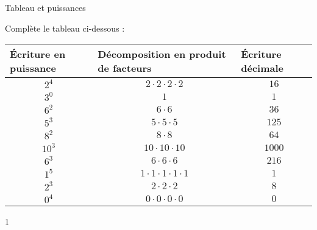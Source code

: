 \documentclass[a4paper,11pt]{report}
\begin{document}
\begin{resolu}{Tableau et puissances}{Complète le tableau ci-dessous : 
\begin{center}
{\renewcommand{\arraystretch}{1.8}
\begin{tabular}{|m{4.6cm}|m{4.6cm}|m{4.6cm}|}\hline
Écriture en puissance    & Décomposition en produit de facteurs  & Écriture décimale\\\hline
\multicolumn{1}{|c|}{ $2^4$}    & \multicolumn{1}{c|}{\color{blue}$2\cdot 2 \cdot 2 \cdot 2$} &  \multicolumn{1}{c|}{\color{blue}$16$} \\\hline
 \multicolumn{1}{|c|}{\color{blue} $3^0$} & \multicolumn{1}{c|}{$1$} & \multicolumn{1}{c|}{\color{blue}$1$} \\\hline
\multicolumn{1}{|c|}{\color{blue}$6^2$} & \multicolumn{1}{c|}{\color{blue}$6 \cdot 6$} & \multicolumn{1}{c|}{$36$}\\\hline
\multicolumn{1}{|c|}{$5^3$} & \multicolumn{1}{c|}{\color{blue} $ 5\cdot 5 \cdot 5$} & \multicolumn{1}{c|}{\color{blue}$125$} \\\hline
\multicolumn{1}{|c|}{\color{blue}$8^2$} & \multicolumn{1}{c|}{$8\cdot 8 $} & \multicolumn{1}{c|}{\color{blue}$64 $} \\\hline
\multicolumn{1}{|c|}{\color{blue}$10^3 $} & \multicolumn{1}{c|}{\color{blue} $10\cdot 10 \cdot 10 $} & \multicolumn{1}{c|}{$1000 $} \\\hline
\multicolumn{1}{|c|}{$6^3$} & \multicolumn{1}{c|}{\color{blue} $ 6\cdot 6 \cdot 6$} & \multicolumn{1}{c|}{\color{blue}$216$} \\\hline
\multicolumn{1}{|c|}{\color{blue}$1^5$} & \multicolumn{1}{c|}{$1\cdot 1\cdot 1\cdot 1\cdot 1 $} & \multicolumn{1}{c|}{\color{blue}$1 $} \\\hline
\multicolumn{1}{|c|}{\color{blue}$2^3 $} & \multicolumn{1}{c|}{\color{blue} $2\cdot 2 \cdot 2 $} & \multicolumn{1}{c|}{$8$} \\\hline
\multicolumn{1}{|c|}{$0^4$} & \multicolumn{1}{c|}{\color{blue} $ 0\cdot 0 \cdot 0 \cdot 0$} & \multicolumn{1}{c|}{\color{blue}$0$} \\\hline
\end{tabular}}
\end{center}}{1}
\end{resolu}
\end{document}
